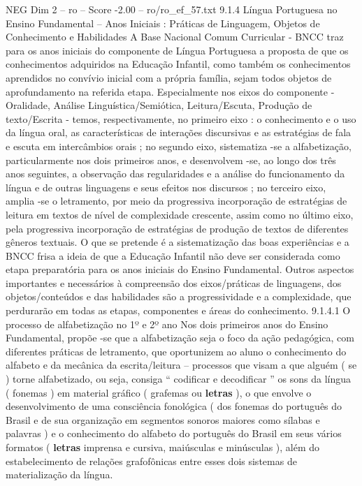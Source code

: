 \begin{textsample}{NEG Dim 2 – ro – Score -2.00 – ro/ro\_ef\_57.txt}  \label{ex:f2_neg_106}
9.1.4 Língua Portuguesa no Ensino Fundamental – Anos Iniciais : Práticas de Linguagem, Objetos de Conhecimento e Habilidades A Base Nacional Comum Curricular - BNCC traz para os anos iniciais do componente de Língua Portuguesa a proposta de que os conhecimentos adquiridos na Educação Infantil, como também os conhecimentos aprendidos no convívio inicial com a própria família, sejam todos objetos de aprofundamento na referida etapa.
Especialmente nos eixos do componente - Oralidade, Análise Linguística/Semiótica, Leitura/Escuta, Produção de texto/Escrita - temos, respectivamente, no primeiro eixo : o conhecimento e o uso da língua oral, as características de interações discursivas e as estratégias de fala e escuta em intercâmbios orais ; no segundo eixo, sistematiza -se a alfabetização, particularmente nos dois primeiros anos, e desenvolvem -se, ao longo dos três anos seguintes, a observação das regularidades e a análise do funcionamento da língua e de outras linguagens e seus efeitos nos discursos ; no terceiro eixo, amplia -se o letramento, por meio da progressiva incorporação de estratégias de leitura em textos de nível de complexidade crescente, assim como no último eixo, pela progressiva incorporação de estratégias de produção de textos de diferentes gêneros textuais.
O que se pretende é a sistematização das boas experiências e a BNCC frisa a ideia de que a Educação Infantil não deve ser considerada como etapa preparatória para os anos iniciais do Ensino Fundamental.
Outros aspectos importantes e necessários à compreensão dos eixos/práticas de linguagens, dos objetos/conteúdos e das habilidades são a progressividade e a complexidade, que perdurarão em todas as etapas, componentes e áreas do conhecimento. 9.1.4.1 O processo de alfabetização no 1º e 2º ano Nos dois primeiros anos do Ensino Fundamental, propõe -se que a alfabetização seja o foco da ação pedagógica, com diferentes práticas de letramento, que oportunizem ao aluno o conhecimento do alfabeto e da mecânica da escrita/leitura – processos que visam a que alguém ( se ) torne alfabetizado, ou seja, consiga “ codificar e decodificar ” os sons da língua ( fonemas ) em material gráfico ( grafemas ou \textbf{letras} ), o que envolve o desenvolvimento de uma consciência fonológica ( dos fonemas do português do Brasil e de sua organização em segmentos sonoros maiores como sílabas e palavras ) e o conhecimento do alfabeto do português do Brasil em seus vários formatos ( \textbf{letras} imprensa e cursiva, maiúsculas e minúsculas ), além do estabelecimento de relações grafofônicas entre esses dois sistemas de materialização da língua.

\end{textsample}
